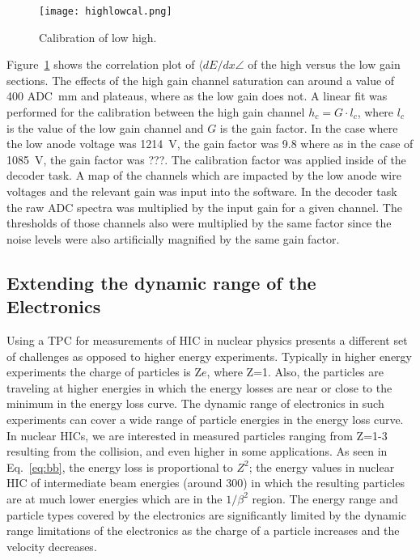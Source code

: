 \begin{figure}[H]
\texttt{[image: highlowcal.png]}
\caption{Calibration of low high.}
\label{fig:highlowcal}
\end{figure}

Figure~\ref{fig:highlowcal} shows the correlation plot of $\langle dE/dx\angle$ of the high versus the low gain sections. The effects of the high gain channel saturation can around a value of 400 ADC\si{\per\milli\metre} and plateaus, where as the low gain does not. A linear fit was performed for the calibration  between the high gain channel $h_c = G\cdot l_c$, where $l_c$ is the value of the low gain channel and $G$ is the gain factor. In the case where the low anode voltage was \SI{1214}{\volt}, the gain factor was 9.8 where as in the case of \SI{1085}{\volt}, the gain factor was ???.  The calibration factor was applied inside of the decoder task. A map of the channels which are impacted by the low anode wire voltages and the relevant gain was input into the software. In the decoder task the raw ADC spectra was multiplied by the input gain for a given channel. The thresholds of those channels also were multiplied by the same factor since the noise levels were also artificially magnified by the same gain factor. 

\subsection{Extending the dynamic range of the Electronics}
Using a TPC for measurements of HIC in nuclear physics presents a different set of challenges as opposed to higher energy experiments. Typically in higher energy experiments the charge of particles is Z$e$, where Z=1. Also, the particles are traveling at higher energies in which the energy losses are near or close to the minimum in the energy loss curve. The dynamic range of electronics in such experiments can cover a wide range of particle energies in the energy loss curve. In nuclear HICs, we are interested in measured particles ranging from Z=1-3 resulting from the collision, and even higher in some applications. As seen in Eq.~\ref{eq:bb}, the energy loss is proportional to $Z^2$; the energy values in nuclear HIC of intermediate beam energies (around \SI{300}{\MeVA}) in which the resulting particles are at much lower energies which are in the $1/\beta^2$ region. The energy range and particle types covered by the electronics are significantly limited by the dynamic range limitations of the electronics as the charge of a particle increases and the velocity decreases. 

